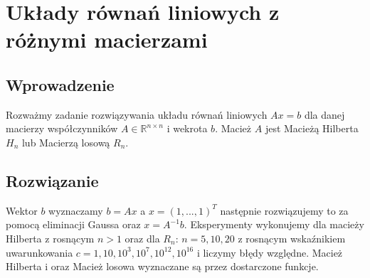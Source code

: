 \documentclass{article}
\begin{document}
\section{Układy równań liniowych z różnymi macierzami}
    \subsection{Wprowadzenie}
    Rozważmy zadanie rozwiązywania układu równań liniowych $Ax=b$ dla danej macierzy współczynników $A \in \mathbb{R}^{n\times n}$ i wekrota $b$. Macież $A$ jest Macieżą Hilberta $H_n$ lub Macierzą losową $R_n$.
    \subsection{Rozwiązanie}
    Wektor $b$ wyznaczamy $b = Ax$ a $x = (1,...,1)^T$ następnie rozwiązujemy to za pomocą eliminacji Gaussa oraz $x=A^{-1}b$. Eksperymenty wykonujemy dla macieży Hilberta z rosnącym $n > 1$ oraz dla $R_n$: $n=5,10,20$ z rosnącym wskaźnikiem uwarunkowania $c=1,10,10^3,10^7,10^12,10^16$ i liczymy błędy względne. Macież Hilberta i oraz Macież losowa wyznaczane są przez dostarczone funkcje.
\end{document}
